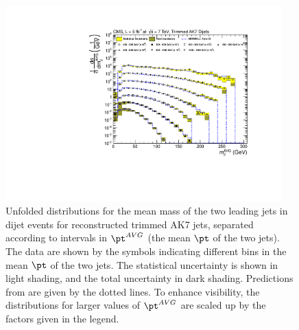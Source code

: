 \begin{figure}[htbp]
\centering
\includegraphics[width=0.95\textwidth]{figs/unfoldedMeasurementDijets_all__Trimmed}
\caption{Unfolded distributions for the mean mass of the two leading jets in dijet events for reconstructed trimmed AK7 jets,
separated according to intervals in $\pt^{AVG}$ (the mean $\pt$ of the two jets).
The data are shown by the symbols indicating different bins in the mean $\pt$ of the two jets. 
The statistical uncertainty is shown in light shading, and the
total uncertainty in dark shading. 
Predictions
from \HERWIG are given by the dotted lines. 
To enhance visibility, the distributions for larger values of $\pt^{AVG}$ 
are scaled up by the factors given in the legend. 
\label{figs:unfoldedMeasurementDijets_all_Trimmed}}
\end{figure}

